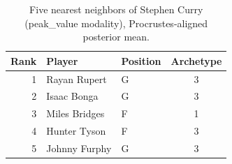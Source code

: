 \begin{table}[htbp]
  \centering\small
  \begin{tabular}{rllc}
    \toprule
    Rank & Player & Position & Archetype \\
    \midrule
    1 & Rayan Rupert & G & 3 \\
    2 & Isaac Bonga & G & 3 \\
    3 & Miles Bridges & F & 1 \\
    4 & Hunter Tyson & F & 3 \\
    5 & Johnny Furphy & G & 3 \\
    \bottomrule
  \end{tabular}
  \caption{Five nearest neighbors of Stephen Curry (peak_value modality), Procrustes-aligned posterior mean.}
  \label{tab:Stephen_Curry_neighbors_peak_value}
\end{table}

